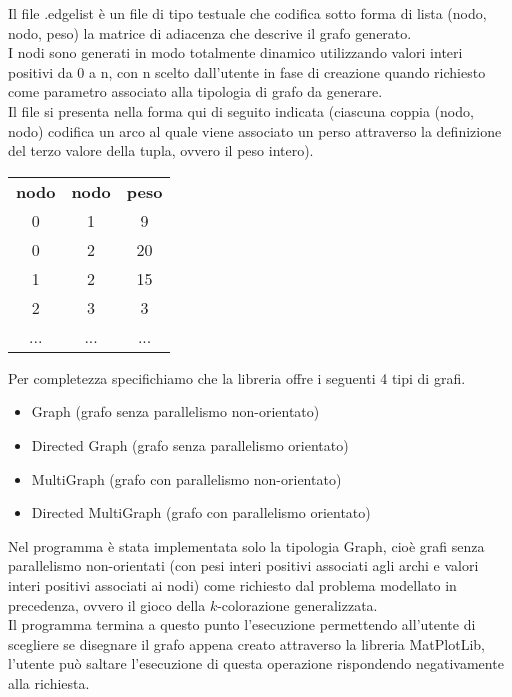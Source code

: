 Il file .edgelist è un file di tipo testuale che codifica sotto forma di lista (nodo, nodo, peso) la matrice di adiacenza che descrive il grafo generato.\\

I nodi sono generati in modo totalmente dinamico utilizzando valori interi positivi da 0 a n, con n scelto dall'utente in fase di creazione quando richiesto come parametro associato alla tipologia di grafo da generare.\\

Il file si presenta nella forma qui di seguito indicata (ciascuna coppia (nodo, nodo) codifica un arco al quale viene associato un perso attraverso la definizione del terzo valore della tupla, ovvero il peso intero).\\

\begin{table}[H]
\centering
\begin{tabular}{ccc}
\textbf{nodo} & \textbf{nodo} & \textbf{peso} \\
0 & 1 & 9 \\
0 & 2 & 20 \\
1 & 2 & 15 \\
2 & 3 & 3 \\
... & ... & ...
\end{tabular}
\end{table}

Per completezza specifichiamo che la libreria offre i seguenti 4 tipi di grafi.

\begin{itemize}
	\item Graph (grafo senza parallelismo non-orientato)
	\item Directed Graph (grafo senza parallelismo orientato)
	\item MultiGraph (grafo con parallelismo non-orientato)
	\item Directed MultiGraph (grafo con parallelismo orientato)
\end{itemize}

Nel programma è stata implementata solo la tipologia Graph, cioè grafi senza parallelismo non-orientati (con pesi interi positivi associati agli archi e valori interi positivi associati ai nodi) come richiesto dal problema modellato in precedenza, ovvero il gioco della \(k\)-colorazione generalizzata.\\

Il programma termina a questo punto l'esecuzione permettendo all'utente di scegliere se disegnare il grafo appena creato attraverso la libreria MatPlotLib, l'utente può saltare l'esecuzione di questa operazione rispondendo negativamente alla richiesta.\\

